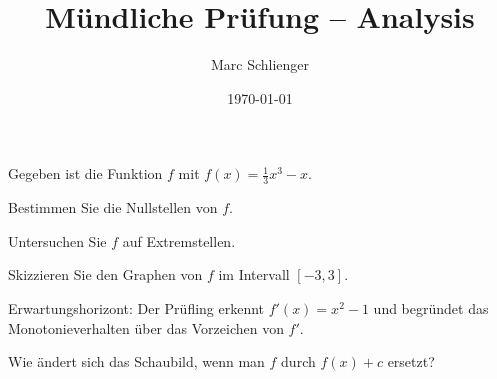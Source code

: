 \documentclass[onehalfspacing, 11pt, a4paper]{mexam}
\title{Mündliche Prüfung -- Analysis}
\author{Marc Schlienger}
\date{\today}
\begin{document}
\maketitle

Gegeben ist die Funktion $f$ mit $f(x) = \frac{1}{3}x^3 - x$.
\begin{menumerate}
	\item Bestimmen Sie die Nullstellen von $f$. 
	\item Untersuchen Sie $f$ auf Extremstellen. 
	\item Skizzieren Sie den Graphen von $f$ im Intervall $[-3, 3]$. 
\end{menumerate}

\begin{minfo*}
	Erwartungshorizont: Der Prüfling erkennt $f'(x) = x^2 - 1$ und begründet
	das Monotonieverhalten über das Vorzeichen von $f'$.
\end{minfo*}

Wie ändert sich das Schaubild, wenn man $f$ durch $f(x) + c$ ersetzt?

\mtotalscore
\end{document}
